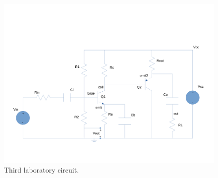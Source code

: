 \begin{figure}[h] \centering
\includegraphics[width=0.8\linewidth]{circuit.pdf}
\caption{Third laboratory circuit.}
\label{fig:circuit}
\end{figure}

